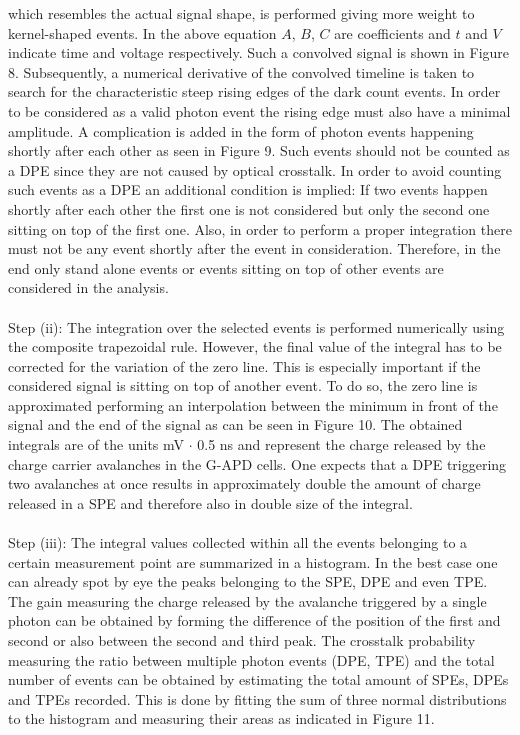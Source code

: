 \documentclass[10pt,a4paper]{article}
\begin{document}
\begin{multicols}{2}
which resembles the actual signal shape, is performed giving more weight to kernel-shaped events. In the above equation $A$, $B$, $C$ are coefficients and $t$ and $V$ indicate time and voltage respectively. Such a convolved signal is shown in Figure 8. Subsequently, a numerical derivative of the convolved timeline is taken to search for the characteristic steep rising edges of the dark count events. In order to be considered as a valid photon event the rising edge must also have a minimal amplitude. A complication is added in the form of photon events happening shortly after each other as seen in Figure 9. Such events should not be counted as a DPE since they are not caused by optical crosstalk. In order to avoid counting such events as a DPE an additional condition is implied: If two events happen shortly after each other the first one is not considered but only the second one sitting on top of the first one. Also, in order to perform a proper integration there must not be any event shortly after the event in consideration. Therefore, in the end only stand alone events or events sitting on top of other events are considered in the analysis.\\  \\  \noindent
Step (ii): The integration over the selected events is performed numerically using the composite trapezoidal rule. However, the final value of the integral has to be corrected for the variation of the zero line. This is especially important if the considered signal is sitting on top of another event. To do so, the zero line is approximated performing an interpolation between the minimum in front of the signal and the end of the signal as can be seen in Figure 10. The obtained integrals are of the units mV $\cdot$ 0.5 ns and represent the charge released by the charge carrier avalanches in the G-APD cells. One expects that a DPE triggering two avalanches at once results in approximately double the amount of charge released in a SPE and therefore also in double size of the integral.\\  \\  \noindent
Step (iii): The integral values collected within all the events belonging to a certain measurement point are summarized in a histogram. In the best case one can already spot by eye the peaks belonging to the SPE, DPE and even TPE. The gain measuring the charge released by the avalanche triggered by a single photon can be obtained by forming the difference of the position of the first and second or also between the second and third peak. The crosstalk probability measuring the ratio between multiple photon events (DPE, TPE) and the total number of events can be obtained by estimating the total amount of SPEs, DPEs and TPEs recorded. This is done by fitting the sum of three normal distributions to the histogram and measuring their areas as indicated in Figure 11.
\end{multicols}
\end{document}
